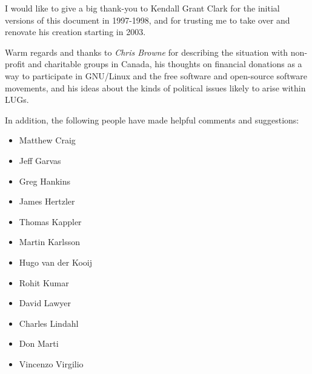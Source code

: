 \documentclass{HOWTO}
\begin{document}
I would like to give a big thank-you to Kendall Grant Clark for the 
initial versions of this document in 1997-1998, and for trusting me to take
over and renovate his creation starting in 2003.

Warm regards and thanks to 
\emph{Chris Browne} \texttt{\aexurl}
 for describing the situation with
non-profit and charitable groups in Canada, his thoughts on financial
donations as a way to participate in GNU/Linux and the free software and 
open-source software movements, and his ideas about the kinds of
political issues likely to arise within LUGs.

In addition, the following people have made helpful comments and
suggestions:

\begin{itemize}
\item Matthew Craig
\item Jeff Garvas
\item Greg Hankins
\item James Hertzler
\item Thomas Kappler
\item Martin Karlsson
\item Hugo van der Kooij
\item Rohit Kumar
\item David Lawyer
\item Charles Lindahl
\item Don Marti
\item Vincenzo Virgilio
\end{itemize}
\end{document}

